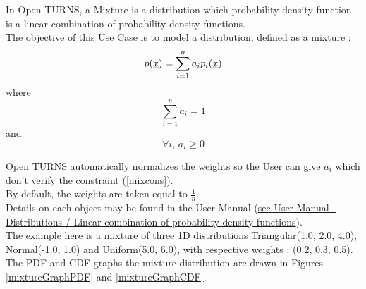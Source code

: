 \renewcommand{\filename}{docUC_InputNoData_Mixture.tex}
\renewcommand{\filetitle}{UC : Creation  of a nD distribution from a Mixture}

\HeaderIIILevel




In Open TURNS, a Mixture is a distribution which probability density function is a linear combination of probability density functions.\\

The objective of this Use Case is to model a distribution, defined as a mixture :
\begin {equation}\label{mixPDF}
  p({\underline{x}}) = \sum_{i=1}^{n} a_i p_i({\underline{x}})
\end{equation}
where 
\begin {equation}\label{mixcons}
\sum_{i=1}^{n} a_i = 1
\end{equation}
and 
\begin {equation}\label{mixcons2}
 \forall i,  \, a_i \geq 0
\end{equation}

Open TURNS automatically normalizes the  weights so the User can give $a_i$ which don't verify the constraint (\ref{mixcons}). \\
By default, the weights are taken equal to $\frac{1}{n}$.\\

Details on each object may be found in the User Manual  (\href{OpenTURNS_UserManual_TUI.pdf}{see User Manual - Distributions / Linear combination of probability density functions}).\\

The example here is a mixture of three 1D distributions Triangular(1.0, 2.0, 4.0), Normal(-1.0, 1.0) and Uniform(5.0, 6.0), with respective weights : (0.2, 0.3, 0.5).\\
The PDF and CDF graphs the mixture distribution are drawn in Figures \ref{mixtureGraphPDF} and  \ref{mixtureGraphCDF}.

